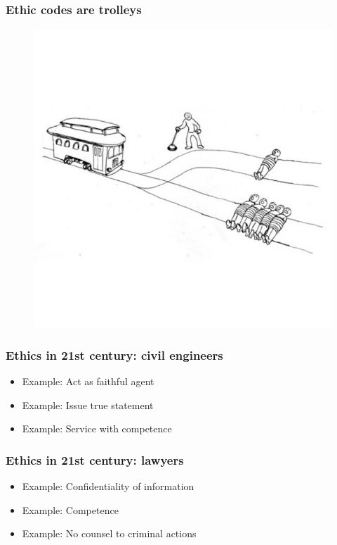 \begin{frame}[fragile]
\frametitle{Ethic codes are trolleys}

\begin{figure}
\includegraphics[scale=0.25]{trolley}
\end{figure}

\end{frame}



\begin{frame}[fragile]
\frametitle{Ethics in 21st century: civil engineers}

\begin{itemize}
\item Example: Act as faithful agent
\item Example: Issue true statement
\item Example: Service with competence
\end{itemize}

\end{frame}

\begin{frame}[fragile]
\frametitle{Ethics in 21st century: lawyers}

\begin{itemize}
\item Example: Confidentiality of information
\item Example: Competence
\item Example: No counsel to criminal actions
\end{itemize}

\end{frame}

